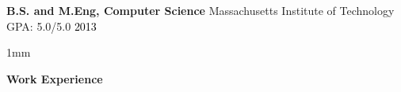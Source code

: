 \documentclass[10pt,A4]{article}
\newcommand{\cvsection}[1]
{
	\begin{center}
		\large\textcolor{sectcol}{\textbf{#1}}
	\end{center}
}
\newcommand{\cvevent}[5]
{

	\textbf{#2} \hspace{1mm} \textcolor{bgcol}{#3} \hfill \vspace{2.5pt}\textcolor{black}{#1}

\vspace{-8pt}
\textcolor{softcol}{\hrule}
\vspace{6pt}

  #4\\[3pt]
  #5\\[6pt]

}
\newcommand{\cvevtzeronohrule}[4]
{

  \textbf{#2} \hspace{1mm} \textcolor{bgcol}{#3} \hfill \vspace{2.5pt}\textcolor{black}{#1}

\vspace{-8pt}
\vspace{6pt}

}
\newcommand{\cvevtone}[4]
{

	\textbf{#2} \hspace{1mm} \textcolor{bgcol}{#3} \hfill \vspace{2.5pt}\textcolor{black}{#1}

\vspace{-8pt}
\vspace{6pt}

  #4\\[3pt]

}
\begin{document}

\cvevtzeronohrule{2013}{B.S. and M.Eng, Computer Science}{\textcolor{sectcol}{Massachusetts Institute of Technology} \hspace{1mm} GPA: 5.0/5.0} %

\vspace{1mm}


%


%


%


%
%

\cvsection{Work Experience}
\end{document}
